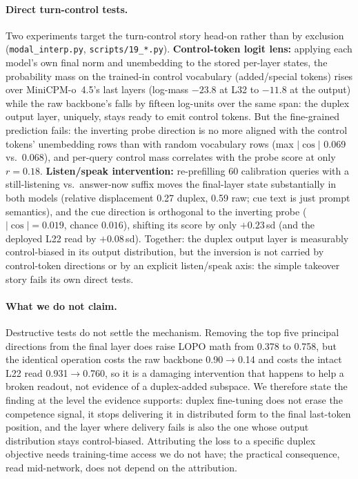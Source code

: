 \paragraph{Direct turn-control tests.} Two experiments target the
turn-control story head-on rather than by exclusion
(\texttt{modal\_interp.py}, \texttt{scripts/19\_*.py}). \textbf{Control-token
logit lens:} applying each model's own final norm and unembedding to
the stored per-layer states, the probability mass on the trained-in
control vocabulary (added/special tokens) rises over
MiniCPM-o~4.5's last layers (log-mass $-23.8$ at L32 to $-11.8$ at the
output) while the raw backbone's falls by fifteen log-units over the
same span: the duplex output layer, uniquely, stays ready to emit
control tokens. But the fine-grained prediction fails: the inverting
probe direction is no more aligned with the control tokens' unembedding
rows than with random vocabulary rows (max $|\cos|$ 0.069 vs.\ 0.068),
and per-query control mass correlates with the probe score at only
$r{=}0.18$. \textbf{Listen/speak intervention:} re-prefilling 60
calibration queries with a still-listening vs.\ answer-now suffix moves
the final-layer state substantially in both models (relative
displacement 0.27 duplex, 0.59 raw; cue text is just prompt
semantics), and the cue direction is orthogonal to the inverting probe
($|\cos|{=}0.019$, chance $0.016$), shifting its score by only
$+0.23$\,sd (and the deployed L22 read by $+0.08$\,sd). Together: the
duplex output layer is measurably control-biased in its output
distribution, but the inversion is not carried by control-token
directions or by an explicit listen/speak axis: the simple
takeover story fails its own direct tests.

\paragraph{What we do not claim.} Destructive tests do not settle the
mechanism. Removing the top five principal directions from the final
layer does raise LOPO math from 0.378 to 0.758, but the identical
operation costs the raw backbone 0.90$\to$0.14 and costs the intact
L22 read 0.931$\to$0.760, so it is a damaging intervention that
happens to help a broken readout, not evidence of a duplex-added
subspace. We therefore state the finding at the level the evidence
supports: duplex fine-tuning does not erase the competence signal, it
stops delivering it in distributed form to the final last-token
position, and the layer where delivery fails is also the one whose
output distribution stays control-biased. Attributing the loss to a
specific duplex objective needs training-time access we do not have;
the practical consequence, read mid-network, does not depend on
the attribution.

